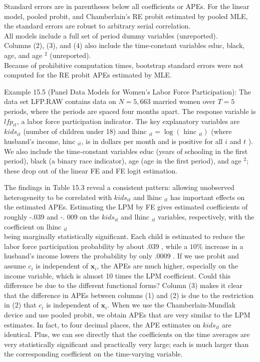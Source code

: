 \documentclass[10pt]{article}
\begin{document}
Standard errors are in parentheses below all coefficients or APEs. For the linear model, pooled probit, and Chamberlain's RE probit estimated by pooled MLE, the standard errors are robust to arbitrary serial correlation.\\
All models include a full set of period dummy variables (unreported).\\
Columns (2), (3), and (4) also include the time-constant variables educ, black, age, and age ${ }^{2}$ (unreported).\\
Because of prohibitive computation times, bootstrap standard errors were not computed for the RE probit APEs estimated by MLE.

Example 15.5 (Panel Data Models for Women's Labor Force Participation): The data set LFP.RAW contains data on $N=5,663$ married women over $T=5$ periods, where the periods are spaced four months apart. The response variable is $l f p_{i t}$, a labor force participation indicator. The key explanatory variables are $k i d s_{i t}$ (number of children under 18) and lhinc $_{i t}=\log \left(\right.$ hinc $\left._{i t}\right)$ (where husband's income, hinc $_{i t}$, is in dollars per month and is positive for all $i$ and $t$ ). We also include the time-constant variables educ (years of schooling in the first period), black (a binary race indicator), age (age in the first period), and age ${ }^{2}$; these drop out of the linear FE and FE logit estimation.

The findings in Table 15.3 reveal a consistent pattern: allowing unobserved heterogeneity to be correlated with $k i d s_{i t}$ and lhinc ${ }_{i t}$ has important effects on the estimated APEs. Estimating the LPM by FE gives estimated coefficients of roughly -.039 and -. 009 on the $k i d s_{i t}$ and lhinc ${ }_{i t}$ variables, respectively, with the coefficient on lhinc ${ }_{i t}$\\
being marginally statistically significant. Each child is estimated to reduce the labor force participation probability by about .039 , while a $10 \%$ increase in a husband's income lowers the probability by only .0009 . If we use probit and assume $c_{i}$ is independent of $\mathbf{x}_{i}$, the APEs are much higher, especially on the income variable, which is almost 10 times the LPM coefficient. Could this difference be due to the different functional forms? Column (3) makes it clear that the difference in APEs between columns (1) and (2) is due to the restriction in (2) that $c_{i}$ is independent of $\mathbf{x}_{i}$. When we use the Chamberlain-Mundlak device and use pooled probit, we obtain APEs that are very similar to the LPM estimates. In fact, to four decimal places, the APE estimates on $k i d s_{i t}$ are identical. Plus, we can see directly that the coefficients on the time averages are very statistically significant and practically very large; each is much larger than the corresponding coefficient on the time-varying variable.
\end{document}
